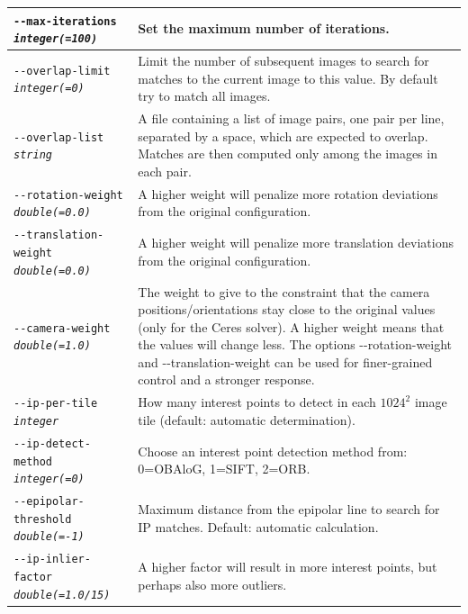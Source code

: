\begin{longtable}{|p{8cm}|p{9cm}|}
\texttt{-\/-max-iterations \textit{integer(=100)}} & Set the maximum
number of iterations. \\ \hline

\texttt{-\/-overlap-limit \textit{integer(=0)}} & Limit the number of
subsequent images to search for matches to the current image to this
value.  By default try to match all images.\\ \hline

\texttt{-\/-overlap-list \textit{string}} & A file containing a list of image pairs, one pair per line, separated by a space, which are expected to overlap. Matches are then computed only among the images in each pair.
\\ \hline

\texttt{-\/-rotation-weight \textit{double(=0.0)}} &
A higher weight will penalize more rotation deviations from the original configuration.
\\ \hline

\texttt{-\/-translation-weight \textit{double(=0.0)}} &
A higher weight will penalize more translation deviations from the original configuration.
\\ \hline

\texttt{-\/-camera-weight \textit{double(=1.0)}} &
The weight to give to the constraint that the camera positions/orientations stay close to
the original values (only for the Ceres solver).  A higher weight means that the values will
change less.  The options -\/-rotation-weight and -\/-translation-weight can be used for finer-grained control and a stronger response.
\\ \hline

\texttt{-\/-ip-per-tile \textit{integer}} &
How many interest points to detect in each $1024^2$ image tile (default: automatic
determination).
\\ \hline

\texttt{-\/-ip-detect-method \textit{integer(=0)}} & Choose an interest point
detection method from: 0=OBAloG, 1=SIFT, 2=ORB. \\ \hline

\texttt{-\/-epipolar-threshold \textit{double(=-1)}} & 
Maximum distance from the epipolar line to search for IP matches. Default: automatic calculation.
\\ \hline

\texttt{-\/-ip-inlier-factor \textit{double(=1.0/15)}} & 
A higher factor will result in more interest points, but perhaps also more outliers.
\\ \hline


\end{longtable}
